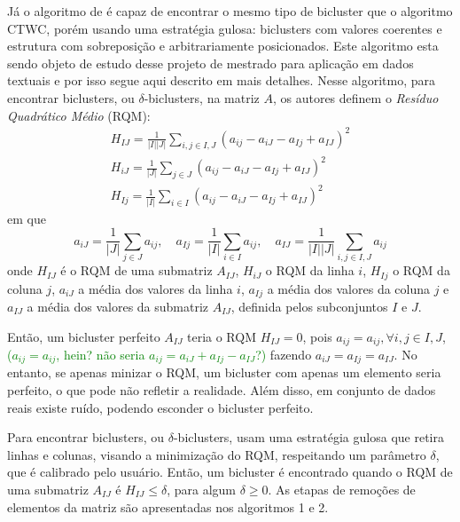 \documentclass[
    12pt,                %
    oneside,            %
    a4paper,            %
    english,            %
    brazil                %
    ]{abntex2ppgsi}
\begin{document}
Já o algoritmo de  é capaz de encontrar o mesmo tipo de bicluster que o algoritmo CTWC, porém usando uma estratégia gulosa: biclusters com valores coerentes e estrutura com sobreposição e arbitrariamente posicionados. Este algoritmo esta sendo objeto de estudo desse projeto de mestrado para aplicação em dados textuais e por isso segue aqui descrito em mais detalhes.
Nesse algoritmo, para encontrar biclusters, ou $\delta$-biclusters, na matriz $A$, os autores definem o \textit{Resíduo Quadrático Médio} (RQM):
\begin{equation}
\begin{split}
    H_{IJ} = \frac{1}{|I||J|} \displaystyle\sum_{i,j \in I,J} (a_{ij} - a_{iJ} - a_{Ij} + a_{IJ})^2 \\
    H_{iJ} = \frac{1}{|J|} \displaystyle\sum_{j \in J} (a_{ij} - a_{iJ} - a_{Ij} + a_{IJ})^2 \\
    H_{Ij} = \frac{1}{|I|} \displaystyle\sum_{i \in I} (a_{ij} - a_{iJ} - a_{Ij} + a_{IJ})^2   \nonumber
\end{split}
\end{equation}
em que
\begin{equation}
    a_{iJ} = \frac{1}{|J|} \displaystyle\sum_{j \in J} a_{ij},\quad a_{Ij} = \frac{1}{|I|} \displaystyle\sum_{i \in I} a_{ij},\quad a_{IJ} = \frac{1}{|I||J|} \displaystyle\sum_{i,j \in I,J} a_{ij}   \nonumber
\end{equation}
onde $H_{IJ}$ é o RQM de uma submatriz $A_{IJ}$, $H_{iJ}$ o RQM da linha $i$, $H_{Ij}$ o RQM da coluna $j$, $a_{iJ}$ a média dos valores da linha $i$, $a_{Ij}$ a média dos valores da coluna $j$ e $a_{IJ}$ a média dos valores da submatriz $A_{IJ}$, definida pelos subconjuntos $I$ e $J$.

Então, um bicluster perfeito $A_{IJ}$ teria o RQM $H_{IJ} = 0$, pois $a_{ij} = a_{ij}, \forall i,j \in I,J$, \textcolor{green}{($a_{ij}=a_{ij}$, hein? não seria $a_{ij}=a_{iJ}+a_{Ij}-a_{IJ}$?)} fazendo $a_{iJ} = a_{Ij} = a_{IJ}$. No entanto, se apenas minizar o RQM, um bicluster com apenas um elemento seria perfeito, o que pode não refletir a realidade. Além disso, em conjunto de dados reais existe ruído, podendo esconder o bicluster perfeito.

Para encontrar biclusters, ou $\delta$-biclusters,  usam uma estratégia gulosa que retira linhas e colunas, visando a minimização do RQM, respeitando um parâmetro $\delta$, que é calibrado pelo usuário. Então, um bicluster é encontrado quando o RQM de uma submatriz $A_{IJ}$ é $H_{IJ} \leq \delta$, para algum $\delta \geq 0$. As etapas de remoções de elementos da matriz são apresentadas nos algoritmos 1 e 2.
\end{document}
